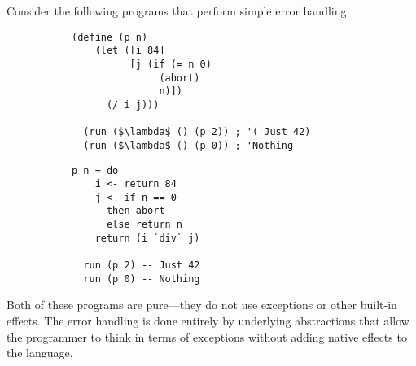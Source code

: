 \documentclass[acmsmall, nonacm, screen]{acmart}
\begin{document}
Consider the following programs that perform simple error handling:
\begin{figure}[H]
\centering
\begin{subfigure}{.5\textwidth}
  \centering
  \begin{lstlisting}[style=rkt, deletekeywords={abort}, mathescape]
  (define (p n)
    (let ([i 84]
          [j (if (= n 0)
               (abort)
               n)])
      (/ i j)))

  (run ($\lambda$ () (p 2)) ; '('Just 42)
  (run ($\lambda$ () (p 0)) ; 'Nothing
  \end{lstlisting}
  \label{fig:racket-state}
\end{subfigure}%
\begin{subfigure}{.5\textwidth}
  \centering
  \begin{lstlisting}[style=hs]
  p n = do
    i <- return 84
    j <- if n == 0
      then abort
      else return n
    return (i `div` j)

  run (p 2) -- Just 42
  run (p 0) -- Nothing
  \end{lstlisting}
  \label{fig:hs-state}
\end{subfigure}
\label{fig:stateful-comps}
\end{figure}
\noindent Both of these programs are pure---they do not use exceptions or other built-in effects.
The error handling is done entirely by underlying abstractions that allow the programmer to think
in terms of exceptions without adding native effects to the language.
\end{document}
